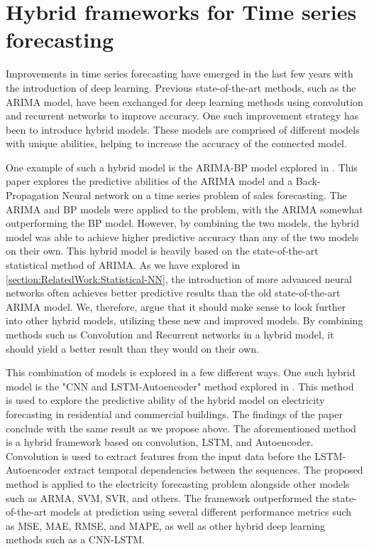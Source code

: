 \section{Hybrid frameworks for Time series forecasting}
\label{section:RelatedWork:Hybrid}

Improvements in time series forecasting have emerged in the last few years with the introduction of deep learning.
Previous state-of-the-art methods, such as the ARIMA model, have been exchanged for deep learning methods using convolution and recurrent networks to improve accuracy.
One such improvement strategy has been to introduce hybrid models.
These models are comprised of different models with unique abilities, helping to increase the accuracy of the connected model.


One example of such a hybrid model is the ARIMA-BP model explored in \cite{Bowen2020}.
This paper explores the predictive abilities of the ARIMA model and a Back-Propagation Neural network on a time series problem of sales forecasting.
The ARIMA and BP models were applied to the problem, with the ARIMA somewhat outperforming the BP model.
However, by combining the two models, the hybrid model was able to achieve higher predictive accuracy than any of the two models on their own.
This hybrid model is heavily based on the state-of-the-art statistical method of ARIMA.
As we have explored in \ref{section:RelatedWork:Statistical-NN}, the introduction of more advanced neural networks often achieves better predictive results than the old state-of-the-art ARIMA model.
We, therefore, argue that it should make sense to look further into other hybrid models, utilizing these new and improved models.
By combining methods such as Convolution and Recurrent networks in a hybrid model, it should yield a better result than they would on their own.


This combination of models is explored in a few different ways.
One such hybrid model is the "CNN and LSTM-Autoencoder" method explored in \cite{Khan2020}.
This method is used to explore the predictive ability of the hybrid model on electricity forecasting in residential and commercial buildings.
The findings of the paper conclude with the same result as we propose above.
The aforementioned method is a hybrid framework based on convolution, LSTM, and Autoencoder.
Convolution is used to extract features from the input data before the LSTM-Autoencoder extract temporal dependencies between the sequences.
The proposed method is applied to the electricity forecasting problem alongside other models such as ARMA, SVM, SVR, and others.
The framework outperformed the state-of-the-art models at prediction using several different performance metrics such as MSE, MAE, RMSE, and MAPE,
as well as other hybrid deep learning methods such as a CNN-LSTM.


